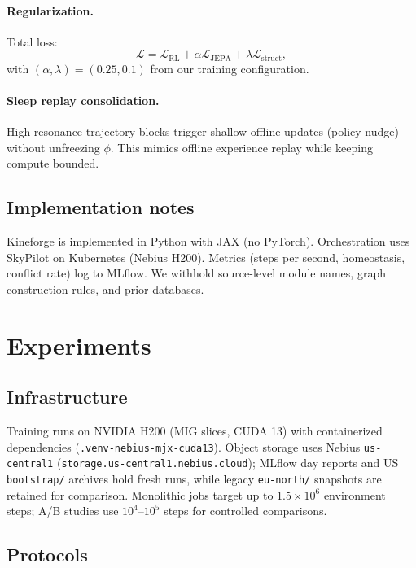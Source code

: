 \documentclass[11pt,a4paper]{article}
\begin{document}
\paragraph{Regularization.}
Total loss:
\begin{equation}
\mathcal{L} = \mathcal{L}_{\mathrm{RL}} + \alpha \mathcal{L}_{\mathrm{JEPA}} + \lambda \mathcal{L}_{\mathrm{struct}},
\end{equation}
with $(\alpha,\lambda){=}(0.25, 0.1)$ from our training configuration.

\paragraph{Sleep replay consolidation.}
High-resonance trajectory blocks trigger shallow offline updates (policy nudge) without unfreezing $\phi$. This mimics offline experience replay while keeping compute bounded.

\subsection{Implementation notes}

Kineforge is implemented in Python with JAX (no PyTorch). Orchestration uses SkyPilot on Kubernetes (Nebius H200). Metrics (steps per second, homeostasis, conflict rate) log to MLflow. We withhold source-level module names, graph construction rules, and prior databases.

\section{Experiments}
\label{sec:experiments}

\subsection{Infrastructure}

Training runs on NVIDIA H200 (MIG slices, CUDA 13) with containerized dependencies (\texttt{.venv-nebius-mjx-cuda13}). Object storage uses Nebius \texttt{us-central1} (\texttt{storage.us-central1.nebius.cloud}); MLflow day reports and US \texttt{bootstrap/} archives hold fresh runs, while legacy \texttt{eu-north/} snapshots are retained for comparison. Monolithic jobs target up to $1.5{\times}10^6$ environment steps; A/B studies use $10^4$--$10^5$ steps for controlled comparisons.

\subsection{Protocols}
\end{document}
